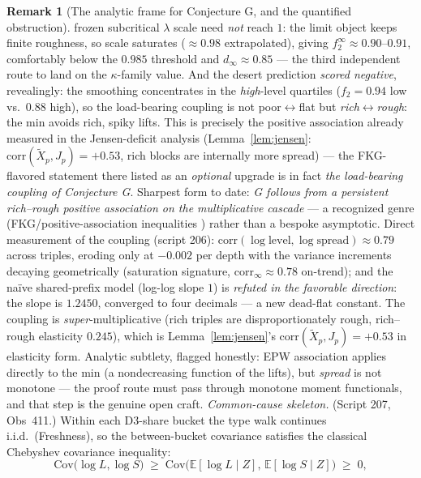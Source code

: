 \documentclass[11pt]{article}
\theoremstyle{definition}
\newtheorem{remark}[theorem]{Remark}
\newcommand{\lam}{\lambda}
\begin{document}
\begin{remark}[The analytic frame for Conjecture G, and the quantified
obstruction]
frozen subcritical $\lam$ scale need \emph{not} reach $1$: the limit
object keeps finite roughness, so scale saturates ($\approx 0.98$
extrapolated), giving $f_2^\infty \approx 0.90$--$0.91$, comfortably
below the $0.985$ threshold and $d_\infty \approx 0.85$ --- the third
independent route to land on the $\kappa$-family value. And the desert
prediction \emph{scored negative}, revealingly: the smoothing
concentrates in the \emph{high}-level quartiles ($f_2 = 0.94$ low
vs.\ $0.88$ high), so the load-bearing coupling is not
poor$\leftrightarrow$flat but \emph{rich$\leftrightarrow$rough}: the
min avoids rich, spiky lifts. This is precisely the positive
association already measured in the Jensen-deficit analysis
(Lemma~\ref{lem:jensen}: $\mathrm{corr}(\tilde X_p, J_p) = +0.53$,
rich blocks are internally more spread) --- the FKG-flavored statement
there listed as an \emph{optional} upgrade is in fact \emph{the
load-bearing coupling of Conjecture G}. Sharpest form to date:
\emph{G follows from a persistent rich--rough positive association on
the multiplicative cascade} --- a recognized genre
(FKG/positive-association inequalities \cite{EPW,FKG}) rather than a
bespoke asymptotic. Direct measurement of the coupling (script 206):
$\mathrm{corr}(\log \mathrm{level}, \log \mathrm{spread}) \approx
0.79$ across triples, eroding only at $-0.002$ per depth with the
variance increments decaying geometrically (saturation signature,
$\mathrm{corr}_\infty \approx 0.78$ on-trend); and the na\"ive
shared-prefix model (log-log slope $1$) is \emph{refuted in the
favorable direction}: the slope is $1.2450$, converged to four decimals
--- a new dead-flat constant. The coupling is \emph{super}-multiplicative
(rich triples are disproportionately rough, rich--rough elasticity
$0.245$), which is Lemma~\ref{lem:jensen}'s
$\mathrm{corr}(\tilde X_p, J_p) = +0.53$ in elasticity form. Analytic
subtlety, flagged honestly: EPW association applies directly to the
min (a nondecreasing function of the lifts), but \emph{spread} is not
monotone --- the proof route must pass through monotone moment
functionals, and that step is the genuine open craft.
\emph{Common-cause skeleton.} (Script 207, Obs~411.) Within each D3-share
bucket the type walk continues i.i.d.\ (Freshness), so the between-bucket
covariance satisfies the classical Chebyshev covariance inequality:
\begin{equation}\label{eq:floor}
\mathrm{Cov}\!\bigl(\log L,\log S\bigr)
\;\ge\; \mathrm{Cov}\!\bigl(\mathbb{E}[\log L\mid Z],\,
\mathbb{E}[\log S\mid Z]\bigr)
\;\ge\; 0,
\end{equation}

\end{remark}
\end{document}
